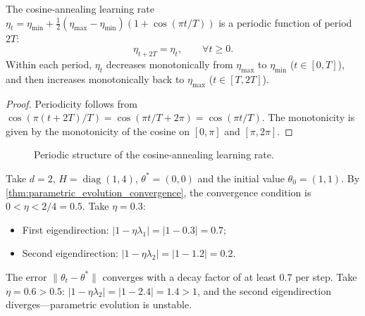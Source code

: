 \begin{proposition}\label{prop:cosine_annealing_period}
The cosine-annealing learning rate $\eta_t = \eta_{\min} + \frac{1}{2}(\eta_{\max}-\eta_{\min})(1+\cos(\pi t/T))$ is a periodic function of period $2T$:
\[
\eta_{t+2T} = \eta_t, \qquad \forall t\ge 0.
\]
Within each period, $\eta_t$ decreases monotonically from $\eta_{\max}$ to $\eta_{\min}$ ($t\in[0,T]$), and then increases monotonically back to $\eta_{\max}$ ($t\in[T,2T]$).
\end{proposition}

\begin{proof}
Periodicity follows from $\cos(\pi(t+2T)/T) = \cos(\pi t/T + 2\pi) = \cos(\pi t/T)$. The monotonicity is given by the monotonicity of the cosine on $[0,\pi]$ and $[\pi,2\pi]$.
\end{proof}

\begin{figure}[htbp]
\centering
{}
\caption{Periodic structure of the cosine-annealing learning rate.}
\label{fig:cosine_annealing}
\end{figure}

\begin{example}\label{ex:parametric_evolution_numeric}
Take $d=2$, $H = \operatorname{diag}(1,4)$, $\theta^* = (0,0)$ and the initial value $\theta_0 = (1,1)$. By \cref{thm:parametric_evolution_convergence}, the convergence condition is $0 < \eta < 2/4 = 0.5$. Take $\eta = 0.3$:
\begin{itemize}
    \item First eigendirection: $|1-\eta\lambda_1| = |1-0.3| = 0.7$;
    \item Second eigendirection: $|1-\eta\lambda_2| = |1-1.2| = 0.2$.
\end{itemize}
The error $\|\theta_t - \theta^*\|$ converges with a decay factor of at least $0.7$ per step. Take $\eta = 0.6 > 0.5$: $|1-\eta\lambda_2| = |1-2.4| = 1.4 > 1$, and the second eigendirection diverges---parametric evolution is unstable.
\end{example}

